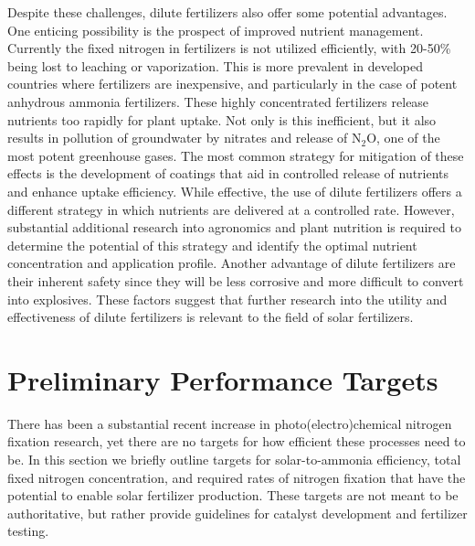 Despite these challenges, dilute fertilizers also offer some potential advantages. One enticing possibility is the prospect of improved nutrient management. Currently the fixed nitrogen in fertilizers is not utilized efficiently, with 20-50\% being lost to leaching or vaporization. This is more prevalent in developed countries where fertilizers are inexpensive, and particularly in the case of potent anhydrous ammonia fertilizers. These highly concentrated fertilizers release nutrients too rapidly for plant uptake. Not only is this inefficient, but it also results in pollution of groundwater by nitrates and release of N$_2$O, one of the most potent greenhouse gases. The most common strategy for mitigation of these effects is the development of coatings that aid in controlled release of nutrients and enhance uptake efficiency. While effective, the use of dilute fertilizers offers a different strategy in which nutrients are delivered at a controlled rate. However, substantial additional research into agronomics and plant nutrition is required to determine the potential of this strategy and identify the optimal nutrient concentration and application profile. Another advantage of dilute fertilizers are their inherent safety since they will be less corrosive and more difficult to convert into explosives. These factors suggest that further research into the utility and effectiveness of dilute fertilizers is relevant to the field of solar fertilizers.

\section{Preliminary Performance Targets}
\label{sec:targets}

There has been a substantial recent increase in photo(electro)chemical nitrogen fixation research, yet there are no targets for how efficient these processes need to be. In this section we briefly outline targets for solar-to-ammonia efficiency, total fixed nitrogen concentration, and required rates of nitrogen fixation that have the potential to enable solar fertilizer production. These targets are not meant to be authoritative, but rather provide guidelines for catalyst development and fertilizer testing. 

